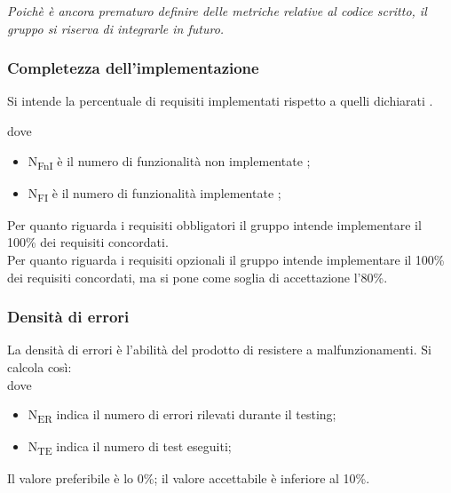 \documentclass[../piano_di_qualifica.tex]{subfiles}
\begin{document}
\emph{Poichè è ancora prematuro definire delle metriche relative al codice scritto, il gruppo si riserva di integrarle in futuro.}

\subsubsection{Completezza dell'implementazione}
Si intende la percentuale di requisiti implementati rispetto a quelli dichiarati .

dove
\begin{itemize}
\item N\textsubscript{FnI} è il numero di funzionalità non implementate ;
\item N\textsubscript{FI} è il numero di funzionalità implementate ;
\end{itemize}

Per quanto riguarda i requisiti obbligatori il gruppo intende implementare il 100\% dei requisiti concordati. \\
Per quanto riguarda i requisiti opzionali il gruppo intende implementare il 100\% dei requisiti concordati, ma si pone come soglia di accettazione l’80\%. 

\subsubsection{Densità di errori}
La densità di errori è l'abilità del prodotto di resistere a malfunzionamenti. Si calcola così:\\


dove
\begin{itemize}
\item N\textsubscript{ER} indica il numero di errori rilevati durante il testing;
\item N\textsubscript{TE} indica il numero di test eseguiti;
\end{itemize}

Il valore preferibile è lo 0\%; il valore accettabile è inferiore al 10\%.

\end{document}
